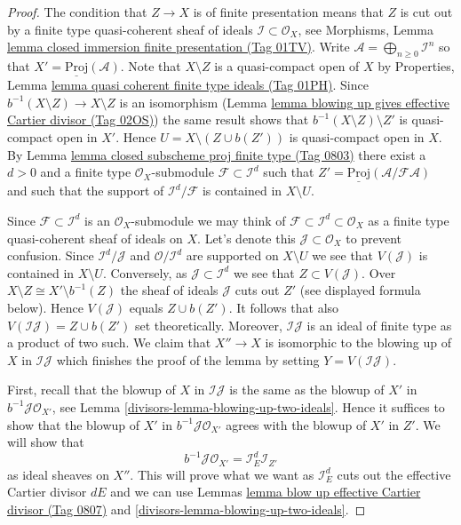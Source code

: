 \documentclass{amsart}
\theoremstyle{plain}
\theoremstyle{definition}
\theoremstyle{remark}
\numberwithin{equation}{subsection}
\begin{document}
\begin{proof}
The condition that $Z \to X$ is of finite presentation means that
$Z$ is cut out by a finite type quasi-coherent sheaf of ideals
$\mathcal{I} \subset \mathcal{O}_X$, see
Morphisms, Lemma \href{https://stacks.math.columbia.edu/tag/01TV}{lemma closed immersion finite presentation (Tag 01TV)}.
Write $\mathcal{A} = \bigoplus_{n \geq 0} \mathcal{I}^n$ so that
$X' = \underline{\text{Proj}}(\mathcal{A})$.
Note that $X \setminus Z$ is a quasi-compact open of $X$ by
Properties, Lemma \href{https://stacks.math.columbia.edu/tag/01PH}{lemma quasi coherent finite type ideals (Tag 01PH)}.
Since $b^{-1}(X \setminus Z) \to X \setminus Z$ is an isomorphism
(Lemma \href{https://stacks.math.columbia.edu/tag/02OS}{lemma blowing up gives effective Cartier divisor (Tag 02OS)}) the same
result shows that
$b^{-1}(X \setminus Z) \setminus Z'$ is quasi-compact open in $X'$.
Hence $U = X \setminus (Z \cup b(Z'))$ is quasi-compact open in $X$.
By Lemma \href{https://stacks.math.columbia.edu/tag/0803}{lemma closed subscheme proj finite type (Tag 0803)}
there exist a $d > 0$ and a finite type
$\mathcal{O}_X$-submodule $\mathcal{F} \subset \mathcal{I}^d$ such
that $Z' = \underline{\text{Proj}}(\mathcal{A}/\mathcal{F}\mathcal{A})$
and such that the support of $\mathcal{I}^d/\mathcal{F}$ is contained
in $X \setminus U$.

\medskip\noindent
Since $\mathcal{F} \subset \mathcal{I}^d$ is an $\mathcal{O}_X$-submodule
we may think of $\mathcal{F} \subset \mathcal{I}^d \subset \mathcal{O}_X$
as a finite type quasi-coherent sheaf of ideals on $X$. Let's denote this
$\mathcal{J} \subset \mathcal{O}_X$ to prevent confusion. Since
$\mathcal{I}^d / \mathcal{J}$ and $\mathcal{O}/\mathcal{I}^d$
are supported on $X \setminus U$ we see that $V(\mathcal{J})$ is contained
in $X \setminus U$. Conversely, as $\mathcal{J} \subset \mathcal{I}^d$
we see that $Z \subset V(\mathcal{J})$. Over
$X \setminus Z \cong X' \setminus b^{-1}(Z)$ the sheaf of ideals
$\mathcal{J}$ cuts out $Z'$ (see displayed formula below). Hence
$V(\mathcal{J})$ equals $Z \cup b(Z')$. It follows that also
$V(\mathcal{I}\mathcal{J}) = Z \cup b(Z')$ set theoretically. Moreover,
$\mathcal{I}\mathcal{J}$ is an ideal of finite type as a product of two such.
We claim that $X'' \to X$ is isomorphic to the blowing up of $X$ in
$\mathcal{I}\mathcal{J}$ which finishes the proof of the lemma by setting
$Y = V(\mathcal{I}\mathcal{J})$.

\medskip\noindent
First, recall that the blowup of $X$ in $\mathcal{I}\mathcal{J}$
is the same as the blowup of $X'$ in $b^{-1}\mathcal{J} \mathcal{O}_{X'}$,
see Lemma \ref{divisors-lemma-blowing-up-two-ideals}.
Hence it suffices to show that the blowup of $X'$ in
$b^{-1}\mathcal{J} \mathcal{O}_{X'}$ agrees with the blowup of $X'$
in $Z'$. We will show that
$$
b^{-1}\mathcal{J} \mathcal{O}_{X'} = \mathcal{I}_E^d \mathcal{I}_{Z'}
$$
as ideal sheaves on $X''$. This will prove what we want as
$\mathcal{I}_E^d$ cuts out the effective Cartier divisor $dE$
and we can use Lemmas \href{https://stacks.math.columbia.edu/tag/0807}{lemma blow up effective Cartier divisor (Tag 0807)} and
\ref{divisors-lemma-blowing-up-two-ideals}.


\end{proof}
\end{document}

